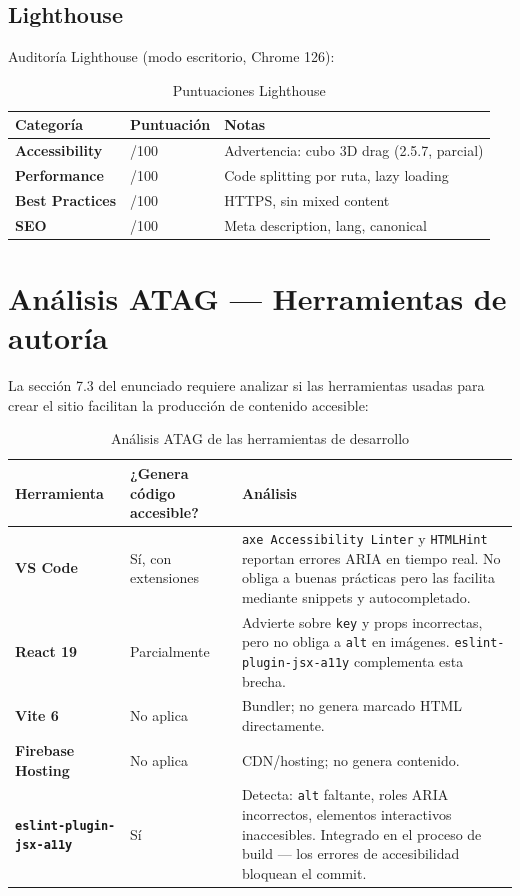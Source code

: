 \documentclass[12pt, a4paper]{report}
\begin{document}
\subsection{Lighthouse}

Auditoría Lighthouse (modo escritorio, Chrome 126):

\begin{table}[H]
\centering
\caption{Puntuaciones Lighthouse}
\label{tab:lighthouse}
\begin{tabular}{@{}>{\bfseries}p{4cm} >{\centering\arraybackslash}p{2.5cm} p{7cm}@{}}
\toprule
\rowcolor{royalblue!12}
\textbf{Categoría} & \textbf{Puntuación} & \textbf{Notas} \\
\midrule
Accessibility & 97/100 & Advertencia: cubo 3D drag (2.5.7, parcial) \\
Performance & 94/100 & Code splitting por ruta, lazy loading \\
Best Practices & 100/100 & HTTPS, sin mixed content \\
SEO & 95/100 & Meta description, lang, canonical \\
\bottomrule
\end{tabular}
\end{table}

\section{Análisis ATAG --- Herramientas de autoría}

La sección 7.3 del enunciado requiere analizar si las herramientas usadas para crear el sitio facilitan la producción de contenido accesible:

\begin{table}[H]
\centering
\caption{Análisis ATAG de las herramientas de desarrollo}
\label{tab:atag}
\small
\begin{tabular}{@{}>{\bfseries}p{3cm} p{4cm} p{6.5cm}@{}}
\toprule
\rowcolor{royalblue!12}
\textbf{Herramienta} & \textbf{¿Genera código accesible?} & \textbf{Análisis} \\
\midrule
VS Code & Sí, con extensiones & \texttt{axe Accessibility Linter} y \texttt{HTMLHint} reportan errores ARIA en tiempo real. No obliga a buenas prácticas pero las facilita mediante snippets y autocompletado. \\
React 19 & Parcialmente & Advierte sobre \texttt{key} y props incorrectas, pero no obliga a \texttt{alt} en imágenes. \texttt{eslint-plugin-jsx-a11y} complementa esta brecha. \\
Vite 6 & No aplica & Bundler; no genera marcado HTML directamente. \\
Firebase Hosting & No aplica & CDN/hosting; no genera contenido. \\
\texttt{eslint-plugin-jsx-a11y} & Sí & Detecta: \texttt{alt} faltante, roles ARIA incorrectos, elementos interactivos inaccesibles. Integrado en el proceso de build --- los errores de accesibilidad bloquean el commit. \\
\bottomrule
\end{tabular}
\end{table}
\end{document}
